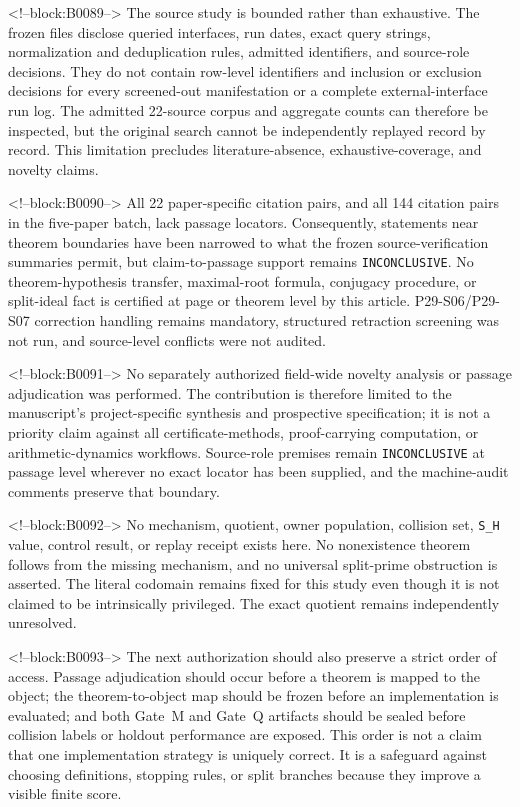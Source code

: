 \documentclass[11pt,a4paper]{article}
\begin{document}
<!--block:B0089-->
The source study is bounded rather than exhaustive. The frozen files disclose queried interfaces, run dates, exact query strings, normalization and deduplication rules, admitted identifiers, and source-role decisions. They do not contain row-level identifiers and inclusion or exclusion decisions for every screened-out manifestation or a complete external-interface run log. The admitted 22-source corpus and aggregate counts can therefore be inspected, but the original search cannot be independently replayed record by record. This limitation precludes literature-absence, exhaustive-coverage, and novelty claims.

<!--block:B0090-->
All 22 paper-specific citation pairs, and all 144 citation pairs in the five-paper batch, lack passage locators. Consequently, statements near theorem boundaries have been narrowed to what the frozen source-verification summaries permit, but claim-to-passage support remains \texttt{INCONCLUSIVE}. No theorem-hypothesis transfer, maximal-root formula, conjugacy procedure, or split-ideal fact is certified at page or theorem level by this article. P29-S06/P29-S07 correction handling remains mandatory, structured retraction screening was not run, and source-level conflicts were not audited.

<!--block:B0091-->
No separately authorized field-wide novelty analysis or passage adjudication was performed. The contribution is therefore limited to the manuscript's project-specific synthesis and prospective specification; it is not a priority claim against all certificate-methods, proof-carrying computation, or arithmetic-dynamics workflows. Source-role premises remain \texttt{INCONCLUSIVE} at passage level wherever no exact locator has been supplied, and the machine-audit comments preserve that boundary.

<!--block:B0092-->
No mechanism, quotient, owner population, collision set, \texttt{S\_H} value, control result, or replay receipt exists here. No nonexistence theorem follows from the missing mechanism, and no universal split-prime obstruction is asserted. The literal codomain remains fixed for this study even though it is not claimed to be intrinsically privileged. The exact quotient remains independently unresolved.

<!--block:B0093-->
The next authorization should also preserve a strict order of access. Passage adjudication should occur before a theorem is mapped to the object; the theorem-to-object map should be frozen before an implementation is evaluated; and both Gate~M and Gate~Q artifacts should be sealed before collision labels or holdout performance are exposed. This order is not a claim that one implementation strategy is uniquely correct. It is a safeguard against choosing definitions, stopping rules, or split branches because they improve a visible finite score.
\end{document}

